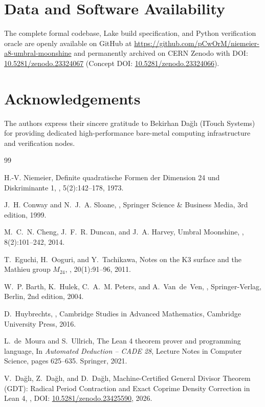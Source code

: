 \documentclass[11pt,a4paper]{article}
\begin{document}
\section*{Data and Software Availability}
The complete formal codebase, Lake build specification, and Python verification oracle are openly available on GitHub at \url{https://github.com/pCwOrM/niemeier-a8-umbral-moonshine} and permanently archived on CERN Zenodo with DOI: \href{https://doi.org/10.5281/zenodo.23324067}{10.5281/zenodo.23324067} (Concept DOI: \href{https://doi.org/10.5281/zenodo.23324066}{10.5281/zenodo.23324066}).

\section*{Acknowledgements}
The authors express their sincere gratitude to Bekirhan Da\u{g}l\i{} (ITouch Systems) for providing dedicated high-performance bare-metal computing infrastructure and verification nodes.

\begin{thebibliography}{99}

H.-V. Niemeier,
\newblock Definite quadratische Formen der Dimension 24 und Diskriminante 1,
, 5(2):142--178, 1973.

J.~H. Conway and N.~J.~A. Sloane,
,
\newblock Springer Science \& Business Media, 3rd edition, 1999.

M.~C.~N. Cheng, J.~F.~R. Duncan, and J.~A. Harvey,
\newblock Umbral Moonshine,
, 8(2):101--242, 2014.

T.~Eguchi, H.~Ooguri, and Y.~Tachikawa,
\newblock Notes on the K3 surface and the Mathieu group $M_{24}$,
, 20(1):91--96, 2011.

W.~P. Barth, K.~Hulek, C.~A.~M. Peters, and A.~Van~de~Ven,
,
\newblock Springer-Verlag, Berlin, 2nd edition, 2004.

D.~Huybrechts,
,
\newblock Cambridge Studies in Advanced Mathematics, Cambridge University Press, 2016.

L.~de~Moura and S.~Ullrich,
\newblock The Lean 4 theorem prover and programming language,
\newblock In {\em Automated Deduction -- CADE 28}, Lecture Notes in Computer Science, pages 625--635. Springer, 2021.

V.~Da\u{g}l\i, Z.~Da\u{g}l\i, and D.~Da\u{g}l\i,
\newblock Machine-Certified General Divisor Theorem (GDT): Radical Period Contraction and Exact Coprime Density Correction in Lean 4,
, DOI: \href{https://doi.org/10.5281/zenodo.23425590}{10.5281/zenodo.23425590}, 2026.

\end{thebibliography}
\end{document}
